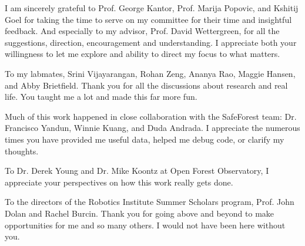 
\setlength{\parskip}{1em}
\setlength{\parindent}{0em}

\noindent
I am sincerely grateful to Prof. George Kantor, Prof. Marija Popovic, and Kshitij Goel for taking the time to serve on my committee for their time and insightful feedback. And especially to my advisor, Prof. David Wettergreen, for all the suggestions, direction, encouragement and understanding. I appreciate both your willingness to let me explore and ability to direct my focus to what matters.

To my labmates, Srini Vijayarangan, Rohan Zeng, Ananya Rao, Maggie Hansen, and Abby Brietfield. Thank you for all the discussions about research and real life. You taught me a lot and made this far more fun.

Much of this work happened in close collaboration with the SafeForest team: Dr. Francisco Yandun, Winnie Kuang, and Duda Andrada. I appreciate the numerous times you have provided me useful data, helped me debug code, or clarify my thoughts. 


To Dr. Derek Young and Dr. Mike Koontz at Open Forest Observatory, I appreciate your perspectives on how this work really gets done. 

To the directors of the Robotics Institute Summer Scholars program, Prof. John Dolan and Rachel Burcin. Thank you for going above and beyond to make opportunities for me and so many others. I would not have been here without you.